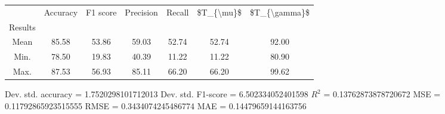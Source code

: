 \begin{tabular}{|c|c|c|c|c|c|c|}
\toprule
{} &  Accuracy &  F1 score &  Precision &  Recall &  \$T\_\{\textbackslash mu\}\$ &  \$T\_\{\textbackslash gamma\}\$ \\
Results &           &           &            &         &            &               \\
\hline
Mean    &     85.58 &     53.86 &      59.03 &   52.74 &      52.74 &         92.00 \\
Min.    &     78.50 &     19.83 &      40.39 &   11.22 &      11.22 &         80.90 \\
Max.    &     87.53 &     56.93 &      85.11 &   66.20 &      66.20 &         99.62 \\
\bottomrule
\end{tabular}

 Dev. std. accuracy = 1.7520298101712013
 Dev. std. F1-score = 6.502334052401598
 $R^2$ = 0.13762873878720672
 MSE = 0.11792865923515555
 RMSE = 0.3434074245486774
 MAE = 0.14479659144163756